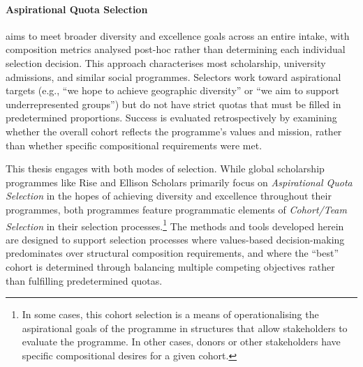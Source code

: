 \paragraph{Aspirational Quota Selection} aims to meet broader diversity and excellence goals across an entire intake, with composition metrics analysed post-hoc rather than determining each individual selection decision. This approach characterises most scholarship, university admissions, and similar social programmes. Selectors work toward aspirational targets (e.g., ``we hope to achieve geographic diversity'' or ``we aim to support underrepresented groups'') but do not have strict quotas that must be filled in predetermined proportions. Success is evaluated retrospectively by examining whether the overall cohort reflects the programme's values and mission, rather than whether specific compositional requirements were met.

This thesis engages with both modes of selection. While global scholarship programmes like Rise and Ellison Scholars primarily focus on \emph{Aspirational Quota Selection} in the hopes of achieving diversity and excellence throughout their programmes, both programmes feature programmatic elements of \emph{Cohort/Team Selection} in their selection processes.\footnote{In some cases, this cohort selection is a means of operationalising the aspirational goals of the programme in structures that allow stakeholders to evaluate the programme. In other cases, donors or other stakeholders have specific compositional desires for a given cohort.} The methods and tools developed herein are designed to support selection processes where values-based decision-making predominates over structural composition requirements, and where the ``best'' cohort is determined through balancing multiple competing objectives rather than fulfilling predetermined quotas.


